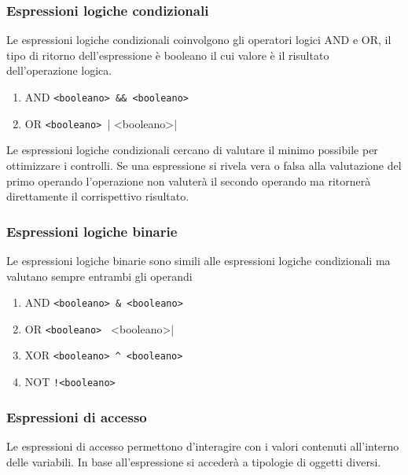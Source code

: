 \subsubsection{Espressioni logiche condizionali}
Le espressioni logiche condizionali coinvolgono gli operatori logici AND e OR,
il tipo di ritorno dell'espressione è booleano il cui valore è il risultato dell'operazione logica.
\begin{enumerate}
    \item AND \verb|<booleano> && <booleano>|
    \item OR \verb|<booleano> || <booleano>|
\end{enumerate}

Le espressioni logiche condizionali cercano di valutare il minimo possibile per ottimizzare i controlli.
Se una espressione si rivela vera o falsa alla valutazione del primo operando l'operazione non 
valuterà il secondo operando ma ritornerà direttamente il corrispettivo risultato.

\subsubsection{Espressioni logiche binarie}
Le espressioni logiche binarie sono simili alle espressioni logiche condizionali ma valutano sempre
entrambi gli operandi
\begin{enumerate}
    \item AND \verb|<booleano> & <booleano>|
    \item OR \verb|<booleano> | <booleano>|
    \item XOR \verb|<booleano> ^ <booleano>|
    \item NOT \verb|!<booleano>|
\end{enumerate}

\subsubsection{Espressioni di accesso}
Le espressioni di accesso permettono d'interagire con i valori contenuti all'interno delle variabili.
In base all'espressione si accederà a tipologie di oggetti diversi.

